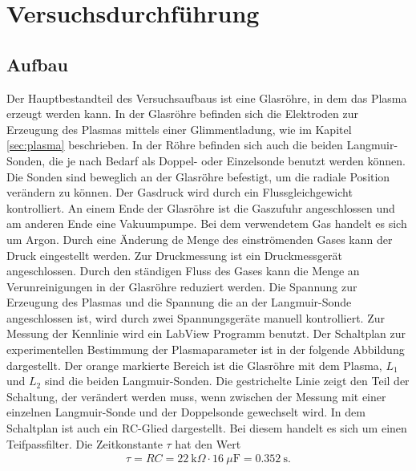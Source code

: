 \section{Versuchsdurchführung}
\subsection{Aufbau}
Der Hauptbestandteil des Versuchsaufbaus ist eine Glasröhre, in dem das Plasma erzeugt werden kann. In der Glasröhre befinden sich die Elektroden zur Erzeugung des Plasmas mittels einer Glimmentladung, wie im Kapitel \ref{sec:plasma} beschrieben. In der Röhre befinden sich auch die beiden Langmuir-Sonden, die je nach Bedarf als Doppel- oder Einzelsonde benutzt werden können. Die Sonden sind beweglich an der Glasröhre befestigt, um die radiale Position verändern zu können. Der Gasdruck wird durch ein Flussgleichgewicht kontrolliert. An einem Ende der Glasröhre ist die Gaszufuhr angeschlossen und am anderen Ende eine Vakuumpumpe. Bei dem verwendetem Gas handelt es sich um Argon. Durch eine Änderung de Menge des einströmenden Gases kann der Druck eingestellt werden. Zur Druckmessung ist ein Druckmessgerät angeschlossen. Durch den ständigen Fluss des Gases kann die Menge an Verunreinigungen in der Glasröhre reduziert werden. Die Spannung zur Erzeugung des Plasmas und die Spannung die an der Langmuir-Sonde angeschlossen ist, wird durch zwei Spannungsgeräte manuell kontrolliert. Zur Messung der Kennlinie wird ein LabView Programm benutzt. Der Schaltplan zur experimentellen Bestimmung der Plasmaparameter ist in der folgende Abbildung dargestellt. Der orange markierte Bereich ist die Glasröhre mit dem Plasma, $L_1$ und $L_2$ sind die beiden Langmuir-Sonden. Die gestrichelte Linie zeigt den Teil der Schaltung, der verändert werden muss, wenn zwischen der Messung mit einer einzelnen Langmuir-Sonde und der Doppelsonde gewechselt wird. In dem Schaltplan ist auch ein RC-Glied dargestellt. Bei diesem handelt es sich um einen Teifpassfilter. Die Zeitkonstante $\tau$ hat den Wert
\begin{align}
  \tau = R C = 22\ \mathrm{k} \Omega \cdot 16\ \mu \mathrm{F} = 0.352\ \mathrm{s}.
\end{align}


